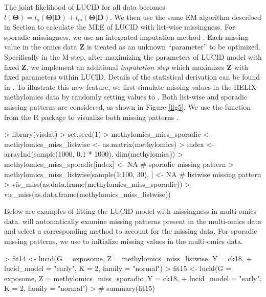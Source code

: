 The joint likelihood of LUCID for all data becomes $l(\bm{\Theta}) = l_o (\bm{\Theta}|\bm{D}) +l_m (\bm{\Theta}|\bm{D})$. We then use the same EM algorithm described in Section  to calculate the MLE of LUCID with list-wise missingness.
For sporadic missingness, we use an integrated imputation method \citep{zhang2021gaussian}. Each missing value in the omics data $\bm Z$ is treated as an unknown ``parameter'' to be optimized. Specifically in the M-step, after maximizing the parameters of LUCID model with fixed $\bm Z$, we implement an additional \emph{imputation step} which maximizes $\bm Z$ with fixed parameters within LUCID. Details of the statistical derivation can be found in \citet{zhang2021gaussian}.
To illustrate this new feature, we first simulate missing values in the HELIX methylomics data by randomly setting values to . Both list-wise and sporadic missing patterns are considered, as shown in Figure \ref{fig5}. We use the  function from the R package  to visualize both missing patterns \citep{visdat}. 
\begin{example}
> library(visdat)
> set.seed(1)
> methylomics_miss_sporadic <- methylomics_miss_listwise <- as.matrix(methylomics)
> index <- arrayInd(sample(1000, 0.1 * 1000), dim(methylomics))
> methylomics_miss_sporadic[index] <- NA # sporadic missing pattern
> methylomics_miss_listwise[sample(1:100, 30), ] <- NA # listwise missing pattern
> vis_miss(as.data.frame(methylomics_miss_sporadic))
> vis_miss(as.data.frame(methylomics_miss_listwise))
\end{example}
Below are examples of fitting the LUCID model with missingness in multi-omics data.  will automatically examine missing patterns present in the multi-omics data and select a corresponding method to account for the missing data. For sporadic missing patterns, we use  to initialize missing values in the multi-omics data. 
\begin{example}
> fit14 <- lucid(G = exposome, Z = methylomics_miss_listwise, Y = ck18, 
+                lucid_model = "early", K = 2, family = "normal")
> fit15 <- lucid(G = exposome, Z = methylomics_miss_sporadic, Y = ck18, 
+                lucid_model = "early", K = 2, family = "normal")
> # summary(fit15)
\end{example}

